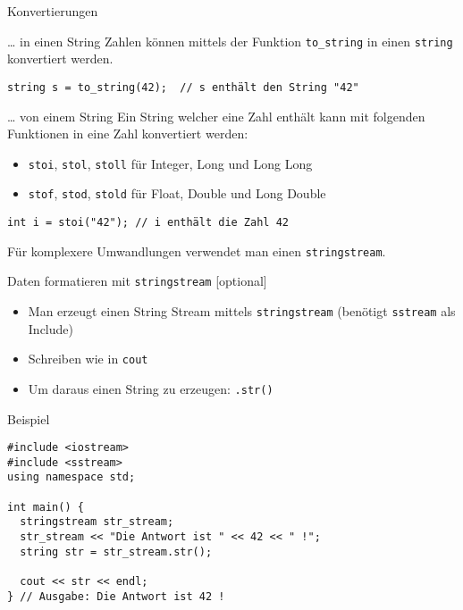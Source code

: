 \documentclass[presentation]{beamer}
\begin{document}
\begin{frame}[label={sec:orgedd4c8d},fragile]{Konvertierungen}
 \begin{block}{\ldots{} in einen String}
Zahlen können mittels der Funktion {\color{solarizedYellow}\verb!to_string!} in einen {\color{solarizedYellow}\verb!string!}
konvertiert werden.
\begin{verbatim}
string s = to_string(42);  // s enthält den String "42"
\end{verbatim}
\end{block}
\begin{block}{\ldots{} von einem String}
Ein String welcher eine Zahl enthält kann mit folgenden Funktionen in
eine Zahl konvertiert werden:
\begin{itemize}
\item {\color{solarizedYellow}\verb!stoi!}, {\color{solarizedYellow}\verb!stol!}, {\color{solarizedYellow}\verb!stoll!} für Integer, Long und Long Long
\item {\color{solarizedYellow}\verb!stof!}, {\color{solarizedYellow}\verb!stod!}, {\color{solarizedYellow}\verb!stold!} für Float, Double und Long Double
\end{itemize}
\begin{verbatim}
int i = stoi("42"); // i enthält die Zahl 42
\end{verbatim}
\end{block}
Für komplexere Umwandlungen verwendet man einen {\color{solarizedYellow}\verb!stringstream!}.
\end{frame}
\begin{frame}[label={sec:org982af3a},fragile]{Daten formatieren mit {\color{solarizedYellow}\texttt{stringstream}} [optional]}
 \begin{itemize}
\item Man erzeugt einen \alert{String Stream} mittels {\color{solarizedYellow}\verb!stringstream!} (benötigt
{\color{solarizedYellow}\verb!sstream!} als Include)
\item Schreiben wie in {\color{solarizedYellow}\verb!cout!}
\item Um daraus einen String zu erzeugen: {\color{solarizedYellow}\verb!.str()!}
\end{itemize}
\begin{exampleblock}{Beispiel}
\begin{verbatim}
#include <iostream>
#include <sstream>
using namespace std;

int main() {
  stringstream str_stream;
  str_stream << "Die Antwort ist " << 42 << " !";
  string str = str_stream.str();

  cout << str << endl;
} // Ausgabe: Die Antwort ist 42 !
\end{verbatim}
\end{exampleblock}
\end{frame}
\end{document}
